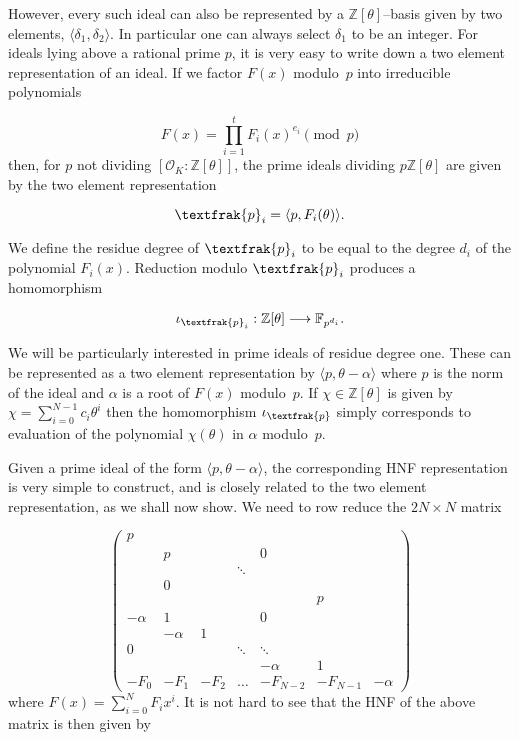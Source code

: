 \documentclass[a4paper, 12pt]{article}
\newcommand{\ndash}{\nobreakdash --}
\newcommand{\bb}[1]{\mathbb{#1}}
\newcommand{\mc}[1]{\mathcal{#1}}
\newcommand{\tfr}[1]{\textfrak{#1}}
\begin{document}
	However, every such ideal can also be represented by a $\bb{Z}[\theta]$\ndash basis given by two elements, $\langle \delta_1, \delta_2 \rangle$.
	In particular one can always select $\delta_1$ to be an integer.
	For ideals lying above a rational prime $p$, it is very easy to write down a two element representation of an ideal.
	If we factor $F(x)$ modulo~$p$ into irreducible
	polynomials
	
	\[
	F(x) = {\prod_{i=1}^{t}{F_i(x)^{e_i}}}\pmod{p}
	\] %
	then, for $p$ not dividing $[\mc{O}_K: \bb{Z}[\theta]]$, the prime ideals dividing $p\bb{Z}[\theta]$ are given by the two element representation
	
	\[
	\tfr{p}_i = \langle p,F_i(\theta) \rangle.
	\]
	
	We define the residue degree of $\tfr{p}_i$ to be equal to the degree $d_i$ of the polynomial $F_i(x)$. Reduction modulo $\tfr{p}_i$ produces a homomorphism
	
	\[
	\iota_{\tfr{p}_i} : \bb{Z}[\theta] \longrightarrow \bb{F}_{p^{d_i}}.
	\]
	
	We will be particularly interested in prime ideals of residue degree one. 
	These can be represented as a two element representation by $\langle p, \theta - \alpha \rangle$ where $p$ is the norm of the ideal and $\alpha$ is a root of $F(x)$ modulo~$p$.
	If $\chi \in \bb{Z}[\theta]$ is given by $\chi = \sum_{i=0}^{N - 1}{c_i \theta^i}$ then the homomorphism $\iota_\tfr{p}$ simply corresponds to evaluation of the polynomial $\chi(\theta)$ in $\alpha$ modulo~$p$.
	
	Given a prime ideal of the form $\langle p, \theta - \alpha \rangle$, the corresponding HNF representation is very simple to construct, and is closely related to the two element	representation, as we shall now show. 
	We need to row reduce the $2N \times N$ matrix
	
	\[
	\begin{pmatrix}
	p & & & & & &\\
	& p & & & 0 & &\\
	& & & \ddots & & &\\
	& 0 & & & & &\\
	& & & & & p &\\
	-\alpha & 1 & & & 0 & &\\
	& -\alpha & 1 & & & &\\
	0 & & & \ddots & \ddots & &\\
	& & & & -\alpha & 1 &\\
	-F_0 & -F_1 & -F_2 & \ldots & -F_{N-2} & -F_{N-1} & -\alpha
	\end{pmatrix}
	\] %
	where $F(x) = \sum_{i=0}^{N}F_i x^i$. It is not hard to see that the HNF of the above matrix is then given by
	
\end{document}
